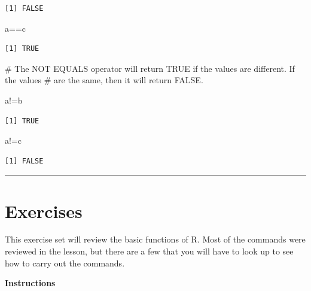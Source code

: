 \documentclass[
  letterpaper,
  DIV=11,
  numbers=noendperiod]{scrreprt}
\newenvironment{Shaded}{\begin{snugshade}}{\end{snugshade}}
\newcommand{\CommentTok}[1]{\textcolor[rgb]{0.37,0.37,0.37}{#1}}
\newcommand{\NormalTok}[1]{\textcolor[rgb]{0.00,0.23,0.31}{#1}}
\newcommand{\SpecialCharTok}[1]{\textcolor[rgb]{0.37,0.37,0.37}{#1}}
\begin{document}
\begin{verbatim}
[1] FALSE
\end{verbatim}

\begin{Shaded}
\begin{Highlighting}[]
\NormalTok{a}\SpecialCharTok{==}\NormalTok{c}
\end{Highlighting}
\end{Shaded}

\begin{verbatim}
[1] TRUE
\end{verbatim}

\begin{Shaded}
\begin{Highlighting}[]
\CommentTok{\# The NOT EQUALS operator will return TRUE if the values are different. If the values}
\CommentTok{\# are the same, then it will return FALSE.}

\NormalTok{a}\SpecialCharTok{!=}\NormalTok{b}
\end{Highlighting}
\end{Shaded}

\begin{verbatim}
[1] TRUE
\end{verbatim}

\begin{Shaded}
\begin{Highlighting}[]
\NormalTok{a}\SpecialCharTok{!=}\NormalTok{c}
\end{Highlighting}
\end{Shaded}

\begin{verbatim}
[1] FALSE
\end{verbatim}

\begin{center}\rule{0.5\linewidth}{0.5pt}\end{center}

\section*{Exercises}\label{exercises-1}


This exercise set will review the basic functions of R. Most of the
commands were reviewed in the lesson, but there are a few that you will
have to look up to see how to carry out the commands.

\textbf{Instructions}
\end{document}
